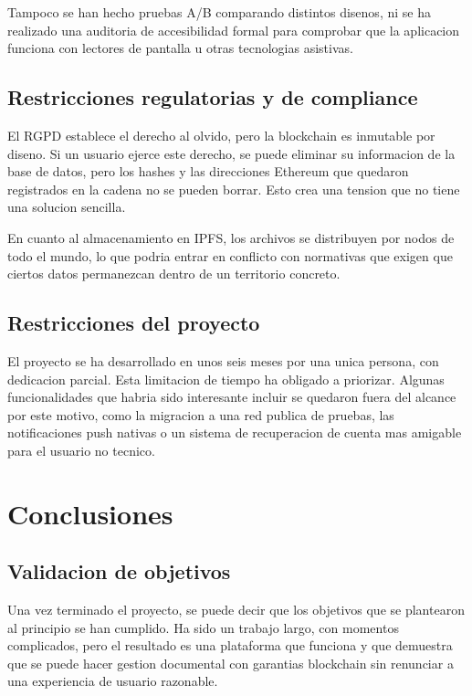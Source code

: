\documentclass[11pt, a4paper]{article}
\begin{document}
Tampoco se han hecho pruebas A/B comparando distintos disenos, ni se ha realizado una auditoria de accesibilidad formal para comprobar que la aplicacion funciona con lectores de pantalla u otras tecnologias asistivas.

\subsection{Restricciones regulatorias y de compliance}

El RGPD establece el derecho al olvido, pero la blockchain es inmutable por diseno. Si un usuario ejerce este derecho, se puede eliminar su informacion de la base de datos, pero los hashes y las direcciones Ethereum que quedaron registrados en la cadena no se pueden borrar. Esto crea una tension que no tiene una solucion sencilla.

En cuanto al almacenamiento en IPFS, los archivos se distribuyen por nodos de todo el mundo, lo que podria entrar en conflicto con normativas que exigen que ciertos datos permanezcan dentro de un territorio concreto.

\subsection{Restricciones del proyecto}

El proyecto se ha desarrollado en unos seis meses por una unica persona, con dedicacion parcial. Esta limitacion de tiempo ha obligado a priorizar. Algunas funcionalidades que habria sido interesante incluir se quedaron fuera del alcance por este motivo, como la migracion a una red publica de pruebas, las notificaciones push nativas o un sistema de recuperacion de cuenta mas amigable para el usuario no tecnico.

\section{Conclusiones}

\subsection{Validacion de objetivos}

Una vez terminado el proyecto, se puede decir que los objetivos que se plantearon al principio se han cumplido. Ha sido un trabajo largo, con momentos complicados, pero el resultado es una plataforma que funciona y que demuestra que se puede hacer gestion documental con garantias blockchain sin renunciar a una experiencia de usuario razonable.
\end{document}
